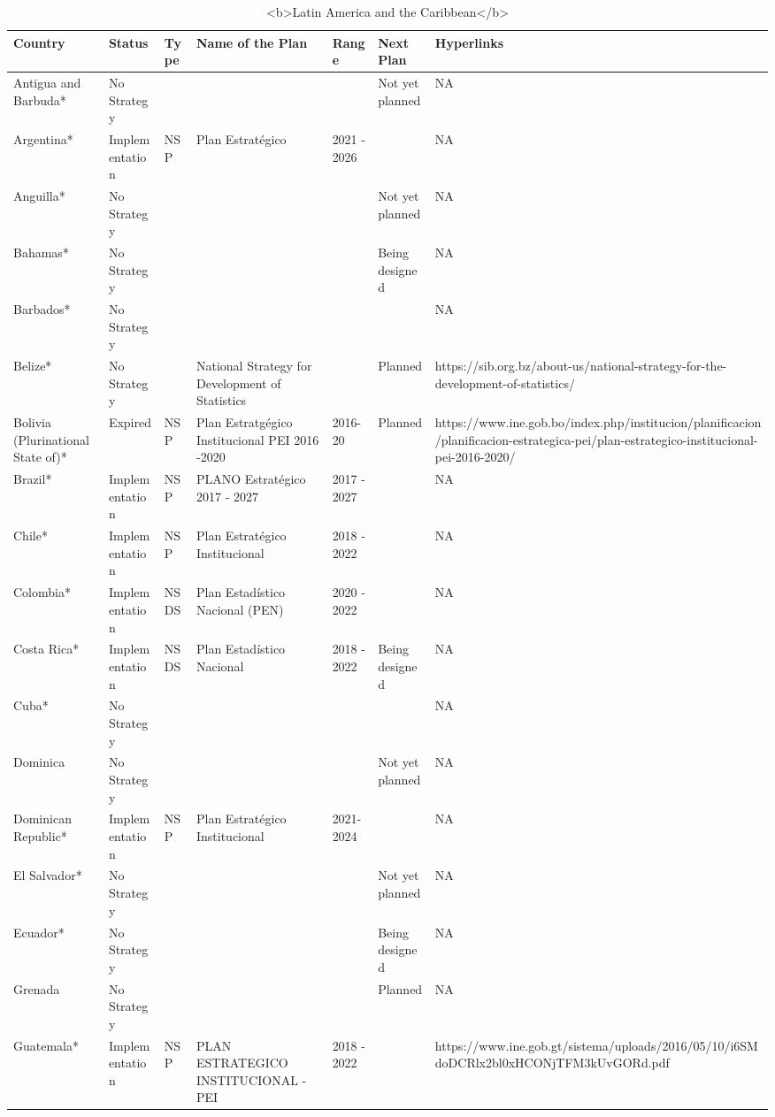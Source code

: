 \documentclass[
]{article}
\begin{document}
\begin{table}

\caption{\label{tab:unnamed-chunk-6}<b>Latin America and the Caribbean</b>}
\centering
\begin{tabular}[t]{lllllll}
\toprule
Country & Status & Type & Name of the Plan & Range & Next Plan & Hyperlinks\\
\midrule
Antigua and Barbuda* & No Strategy &  &  &  & Not yet planned & NA\\
Argentina* & Implementation & NSP & Plan Estratégico & 2021 - 2026 &  & NA\\
Anguilla* & No Strategy &  &  &  & Not yet planned & NA\\
Bahamas* & No Strategy &  &  &  & Being designed & NA\\
Barbados* & No Strategy &  &  &  &  & NA\\
\addlinespace
Belize* & No Strategy &  & National Strategy for Development of Statistics &  & Planned & https://sib.org.bz/about-us/national-strategy-for-the-development-of-statistics/\\
Bolivia (Plurinational State of)* & Expired & NSP & Plan Estratgégico Institucional PEI 2016 -2020 & 2016-20 & Planned & https://www.ine.gob.bo/index.php/institucion/planificacion/planificacion-estrategica-pei/plan-estrategico-institucional-pei-2016-2020/\\
Brazil* & Implementation & NSP & PLANO Estratégico 2017 - 2027 & 2017 - 2027 &  & NA\\
Chile* & Implementation & NSP & Plan Estratégico Institucional & 2018 - 2022 &  & NA\\
Colombia* & Implementation & NSDS & Plan Estadístico Nacional (PEN) & 2020 - 2022 &  & NA\\
\addlinespace
Costa Rica* & Implementation & NSDS & Plan Estadístico Nacional & 2018 - 2022 & Being designed & NA\\
Cuba* & No Strategy &  &  &  &  & NA\\
Dominica & No Strategy &  &  &  & Not yet planned & NA\\
Dominican Republic* & Implementation & NSP & Plan Estratégico Institucional & 2021-2024 &  & NA\\
El Salvador* & No Strategy &  &  &  & Not yet planned & NA\\
\addlinespace
Ecuador* & No Strategy &  &  &  & Being designed & NA\\
Grenada & No Strategy &  &  &  & Planned & NA\\
Guatemala* & Implementation & NSP & PLAN ESTRATEGICO INSTITUCIONAL -PEI & 2018 - 2022 &  & https://www.ine.gob.gt/sistema/uploads/2016/05/10/i6SMdoDCRlx2bl0xHCONjTFM3kUvGORd.pdf\\

\end{tabular}
\end{table}
\end{document}
